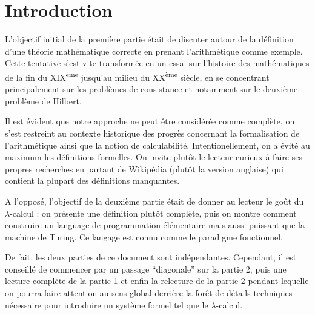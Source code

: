 \documentclass[12pt, a4paper]{article}
\begin{document}
	
\section*{Introduction}
L'objectif initial de la première partie était de discuter autour de la définition d'une théorie mathématique correcte en prenant l'arithmétique comme exemple. Cette tentative s'est vite transformée en un essai sur l'histoire des mathématiques de la fin du XIX\textsuperscript{ème} jusqu'au milieu du XX\textsuperscript{ème} siècle, en se concentrant principalement sur les problèmes de consistance et notamment sur le deuxième problème de Hilbert.

Il est évident que notre approche ne peut être considérée comme complète, on s'est restreint au contexte historique des progrès concernant la formalisation de l'arithmétique ainsi que la notion de calculabilité. Intentionellement, on a évité au maximum les définitions formelles. On invite plutôt le lecteur curieux à faire ses propres recherches en partant de Wikipédia (plutôt la version anglaise) qui contient la plupart des définitions manquantes.

A l'opposé, l'objectif de la deuxième partie était de donner au lecteur le goût du $\lambda$-calcul : on présente une définition plutôt complète, puis on montre comment construire un language de programmation élémentaire mais aussi puissant que la machine de Turing. Ce langage est connu comme le paradigme fonctionnel.

De fait, les deux parties de ce document sont indépendantes. Cependant, il est conseillé de commencer par un passage ``diagonale'' sur la partie 2, puis une lecture complète de la partie 1 et enfin la relecture de la partie 2 pendant lequelle on pourra faire attention au sens global derrière la forêt de détails techniques nécessaire pour introduire un système formel tel que le $\lambda$-calcul.
	





\end{document}
